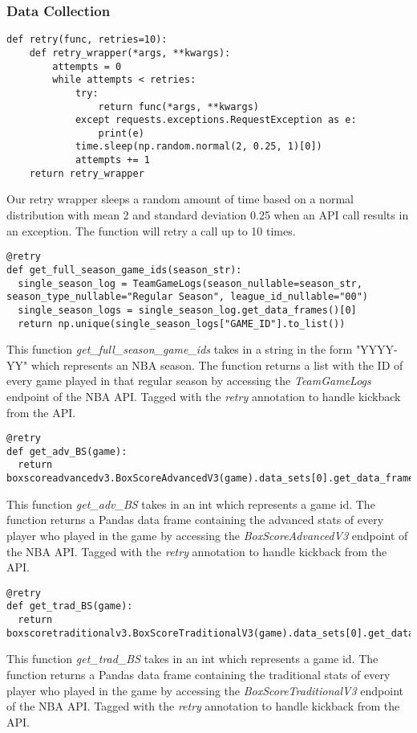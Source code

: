 \documentclass{article}
\begin{document}
\subsubsection{Data Collection}
\begin{lstlisting}
def retry(func, retries=10):
    def retry_wrapper(*args, **kwargs):
        attempts = 0
        while attempts < retries:
            try:
                return func(*args, **kwargs)
            except requests.exceptions.RequestException as e:
                print(e)
            time.sleep(np.random.normal(2, 0.25, 1)[0])
            attempts += 1
    return retry_wrapper
\end{lstlisting}
Our retry wrapper sleeps a random amount of time based on a normal distribution with mean 2 and standard deviation 0.25 when an API call results in an exception. The function will retry a call up to 10 times.
\begin{lstlisting}
@retry
def get_full_season_game_ids(season_str):
  single_season_log = TeamGameLogs(season_nullable=season_str, season_type_nullable="Regular Season", league_id_nullable="00")
  single_season_logs = single_season_log.get_data_frames()[0]
  return np.unique(single_season_logs["GAME_ID"].to_list())
\end{lstlisting}
This function \textit{get_full_season_game_ids} takes in a string in the form "YYYY-YY" which represents an NBA season. The function returns a list with the ID of every game played in that regular season by accessing the \textit{TeamGameLogs} endpoint of the NBA API. Tagged with the \textit{retry} annotation to handle kickback from the API.
\begin{lstlisting}
@retry
def get_adv_BS(game):
  return boxscoreadvancedv3.BoxScoreAdvancedV3(game).data_sets[0].get_data_frame()
\end{lstlisting}
This function \textit{get_adv_BS} takes in an int which represents a game id. The function returns a Pandas data frame containing the advanced stats of every player who played in the game by accessing the \textit{BoxScoreAdvancedV3} endpoint of the NBA API. Tagged with the \textit{retry} annotation to handle kickback from the API.
\begin{lstlisting}
@retry
def get_trad_BS(game):
  return boxscoretraditionalv3.BoxScoreTraditionalV3(game).data_sets[0].get_data_frame()
\end{lstlisting}
This function \textit{get_trad_BS} takes in an int which represents a game id. The function returns a Pandas data frame containing the traditional stats of every player who played in the game by accessing the \textit{BoxScoreTraditionalV3} endpoint of the NBA API. Tagged with the \textit{retry} annotation to handle kickback from the API.
\end{document}
